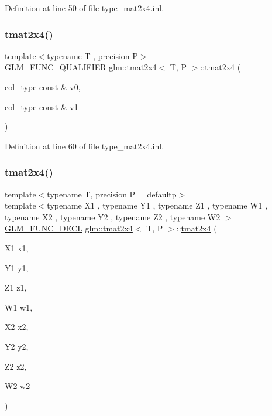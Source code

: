 Definition at line 50 of file type\+\_\+mat2x4.\+inl.

\mbox{\label{structglm_1_1tmat2x4_ab80c8f32add0a9897a7d179597f07a25}} 
\subsubsection{\texorpdfstring{tmat2x4()}{tmat2x4()}\hspace{0.1cm}{\footnotesize\ttfamily [7/22]}}
{\footnotesize\ttfamily template$<$typename T , precision P$>$ \\
\mbox{\hyperlink{setup_8hpp_a33fdea6f91c5f834105f7415e2a64407}{G\+L\+M\+\_\+\+F\+U\+N\+C\+\_\+\+Q\+U\+A\+L\+I\+F\+I\+ER}} \mbox{\hyperlink{structglm_1_1tmat2x4}{glm\+::tmat2x4}}$<$ T, P $>$\+::\mbox{\hyperlink{structglm_1_1tmat2x4}{tmat2x4}} (\begin{DoxyParamCaption}\item[{\mbox{\hyperlink{structglm_1_1tmat2x4_a9effcccd2c4c50c385e4c3a2fe2feedb}{col\+\_\+type}} const \&}]{v0,  }\item[{\mbox{\hyperlink{structglm_1_1tmat2x4_a9effcccd2c4c50c385e4c3a2fe2feedb}{col\+\_\+type}} const \&}]{v1 }\end{DoxyParamCaption})}



Definition at line 60 of file type\+\_\+mat2x4.\+inl.

\mbox{\label{structglm_1_1tmat2x4_ad2e63f3024aafac70e1c7dc97fa50b37}} 
\subsubsection{\texorpdfstring{tmat2x4()}{tmat2x4()}\hspace{0.1cm}{\footnotesize\ttfamily [8/22]}}
{\footnotesize\ttfamily template$<$typename T, precision P = defaultp$>$ \\
template$<$typename X1 , typename Y1 , typename Z1 , typename W1 , typename X2 , typename Y2 , typename Z2 , typename W2 $>$ \\
\mbox{\hyperlink{setup_8hpp_ab2d052de21a70539923e9bcbf6e83a51}{G\+L\+M\+\_\+\+F\+U\+N\+C\+\_\+\+D\+E\+CL}} \mbox{\hyperlink{structglm_1_1tmat2x4}{glm\+::tmat2x4}}$<$ T, P $>$\+::\mbox{\hyperlink{structglm_1_1tmat2x4}{tmat2x4}} (\begin{DoxyParamCaption}\item[{X1}]{x1,  }\item[{Y1}]{y1,  }\item[{Z1}]{z1,  }\item[{W1}]{w1,  }\item[{X2}]{x2,  }\item[{Y2}]{y2,  }\item[{Z2}]{z2,  }\item[{W2}]{w2 }\end{DoxyParamCaption})}

